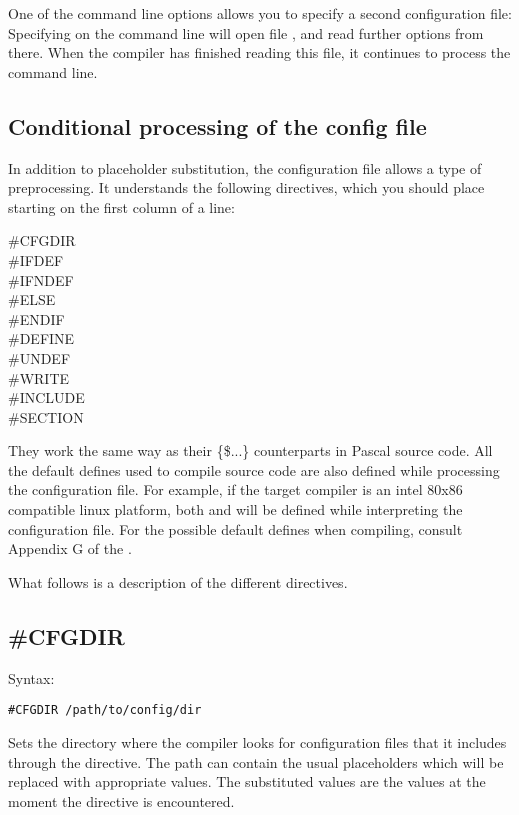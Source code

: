 One of the command line options allows you to specify a second configuration
file: Specifying  on the command line will open file ,
and read further options from there. When the compiler has finished reading
this file, it continues to process the command line.

\subsection{Conditional processing of the config file}
In addition to placeholder substitution, the configuration file allows a type of preprocessing.
It understands the following directives, which you should place starting on the first column of a line:
\begin{description}
\item [\#CFGDIR]
\item [\#IFDEF]
\item [\#IFNDEF]
\item [\#ELSE]
\item [\#ENDIF]
\item [\#DEFINE]
\item [\#UNDEF]
\item [\#WRITE]
\item [\#INCLUDE]
\item [\#SECTION]
\end{description}
They work the same way as their \{\$...\}  counterparts in Pascal source code. 
All the default defines used to compile source code are also defined while 
processing the configuration file. For example, if the target compiler is an 
intel 80x86 compatible linux platform, both  and  will be 
defined while interpreting the configuration file. For the possible default 
defines when compiling, consult Appendix G of the \progref.

What follows is a description of the different directives.

\subsection{\#CFGDIR}
Syntax:
\begin{verbatim}
#CFGDIR /path/to/config/dir
\end{verbatim}
Sets the directory where the compiler looks for configuration files that it
includes through the  directive.  The path can contain the
usual placeholders which will be replaced with appropriate values.
The substituted values are the values at the moment the  directive is
encountered.

